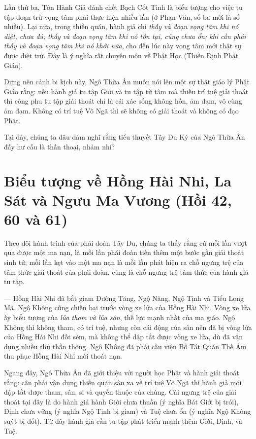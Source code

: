 Lần thứ ba, Tôn Hành Giả đánh chết Bạch Cốt Tinh là biểu tượng cho việc tu tập đoạn trừ vọng tâm phải thực hiện nhiều lần (ở Phạn Văn, số ba mới là số nhiều). Lại nữa, trong thiền quán, hành giả chỉ \emph{thấy và đoạn vọng tâm khi nó diệt, chưa đủ; thấy và đoạn vọng tâm khi nó tồn tại, cũng chưa ổn; khi cần phải thấy và đoạn vọng tâm khi nó khởi nữa}, cho đến lúc này vọng tâm mới thật sự được diệt trừ. Đây là ý nghĩa rất chuyên môn về Phật Học (Thiền Định Phật Giáo).

Dựng nên cảnh bi kịch này, Ngô Thừa Ân muốn nói lên một sự thật giáo lý Phật Giáo rằng: nếu hành giả tu tập Giới và tu tập từ tâm mà thiếu trí tuệ giải thoát thì công phu tu tập giải thoát chỉ là cái xác sống không hồn, ảm đạm, vô cùng ảm đạm. Không có trí tuệ Vô Ngã thì sẽ không có giải thoát và không có đạo Phật.

Tại đây, chúng ta đâu dám nghĩ rằng tiểu thuyết Tây Du Ký của Ngô Thừa Ân đầy hư cấu là thần thoại, nhảm nhí?


\section{Biểu tượng về Hồng Hài Nhi, La Sát và Ngưu Ma Vương (Hồi 42, 60 và 61)} %
\label{sec:bieu_tuong_ve_hong_hai_nhi_va_nguu_ma_vuong}

Theo dõi hành trình của phái đoàn Tây Du, chúng ta thấy rằng cứ mỗi lần vượt qua được một ma nạn, là mỗi lần phái đoàn tiến thêm một bước gần giải thoát sinh tử; mỗi lần kẹt vào một ma nạn là mỗi lần phát hiện ra chỗ ngưng trệ của tâm thức giải thoát của phái đoàn, cũng là chỗ ngưng trệ tâm thức của hành giả tu tập.

— Hồng Hài Nhi đã bắt giam Đường Tăng, Ngộ Năng, Ngộ Tịnh và Tiểu Long Mã. Ngộ Không cũng chiến bại trước vòng xe lửa của Hồng Hài Nhi. Vòng xe lửa ấy biểu tượng của \emph{lửa tham và lửa sân}, thế lực mạnh nhất của ma giáo. Ngộ Không thì không tham, có trí tuệ, nhưng còn cái động của sân nên đã bị vòng lửa của Hồng Hài Nhi đốt sém, mà không thể dập tắt được vòng xe lửa, dù đã vận dụng nhiều thứ thần thông. Ngộ Không đã phải cầu viện Bồ Tát Quán Thế Âm thu phục Hồng Hài Nhi mới thoát nạn.

Ngang đây, Ngô Thừa Ân đã giới thiệu với người học Phật và hành giải thoát rằng: cần phải vận dụng thiền quán sâu xa về trí tuệ Vô Ngã thì hành giả mới dập tắt được tham, sân, si và quyến thuộc của chúng. Cái ngưng trệ của giải thoát tại đây là do hành giả hành Giới chưa thuần (ý nghĩa Bát Giới bị trói), Định chưa vững (ý nghĩa Ngộ Tịnh bị giam) và Tuệ chưa ổn (ý nghĩa Ngộ Không suýt bị đốt). Từ đây hành giả cần tu tập phát triển mạnh thêm Giới, Định, và Tuệ.

